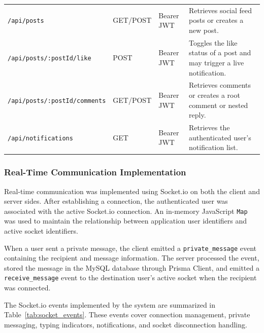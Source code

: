 \documentclass[12pt, a4paper]{article}
\begin{document}
\begin{table}[htbp]
{\begin{tabular}{p{5.2cm} p{1.5cm} p{2.2cm} p{7.2cm}}
\texttt{/api/posts} & GET/POST & Bearer JWT &
Retrieves social feed posts or creates a new post. \\

\texttt{/api/posts/:postId/like} & POST & Bearer JWT &
Toggles the like status of a post and may trigger a live notification. \\

\texttt{/api/posts/:postId/comments} & GET/POST & Bearer JWT &
Retrieves comments or creates a root comment or nested reply. \\

\texttt{/api/notifications} & GET & Bearer JWT &
Retrieves the authenticated user's notification list. \\
\bottomrule
\end{tabular}%
}
\end{table}


\subsubsection{Real-Time Communication Implementation}

Real-time communication was implemented using Socket.io on both the client and server sides. After establishing a connection, the authenticated user was associated with the active Socket.io connection. An in-memory JavaScript \texttt{Map} was used to maintain the relationship between application user identifiers and active socket identifiers.

When a user sent a private message, the client emitted a \texttt{private\_message} event containing the recipient and message information. The server processed the event, stored the message in the MySQL database through Prisma Client, and emitted a \texttt{receive\_message} event to the destination user's active socket when the recipient was connected.

The Socket.io events implemented by the system are summarized in Table~\ref{tab:socket_events}. These events cover connection management, private messaging, typing indicators, notifications, and socket disconnection handling.
\end{document}
